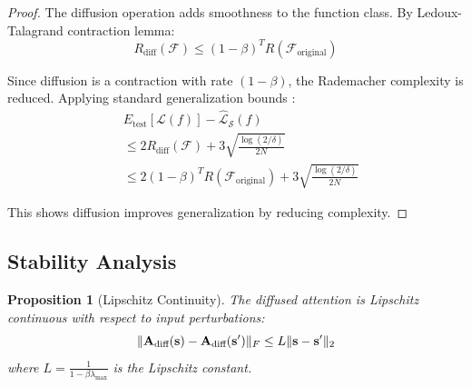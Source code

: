 \documentclass[11pt]{article}
\newtheorem{proof}{Proof}
\newtheorem{proposition}{Proposition}
\DeclarePairedDelimiter{\norm}{\lVert}{\rVert}
\begin{document}
\begin{proof}
The diffusion operation adds smoothness to the function class. By Ledoux-Talagrand contraction lemma:
\begin{equation}
    R_{\text{diff}}(\mathcal{F}) \leq (1-\beta)^T R(\mathcal{F}_{\text{original}})
\end{equation}

Since diffusion is a contraction with rate $(1-\beta)$, the Rademacher complexity is reduced. Applying standard generalization bounds \citep{mohri2018foundations}:
\begin{align}
    &E_{\text{test}}[\mathcal{L}(f)] - \hat{\mathcal{L}}_{\mathcal{S}}(f) \\
    &\leq 2 R_{\text{diff}}(\mathcal{F}) + 3\sqrt{\frac{\log(2/\delta)}{2N}} \\
    &\leq 2(1-\beta)^T R(\mathcal{F}_{\text{original}}) + 3\sqrt{\frac{\log(2/\delta)}{2N}}
\end{align}

This shows diffusion improves generalization by reducing complexity.
\end{proof}

\subsection{Stability Analysis}

\begin{proposition}[Lipschitz Continuity]
The diffused attention is Lipschitz continuous with respect to input perturbations:
\begin{equation}
    \norm{\mathbf{A}_{\text{diff}}(\mathbf{s}) - \mathbf{A}_{\text{diff}}(\mathbf{s}')}_F \leq L \norm{\mathbf{s} - \mathbf{s}'}_2
\end{equation}
where $L = \frac{1}{1-\beta\lambda_{\max}}$ is the Lipschitz constant.
\end{proposition}
\end{document}
